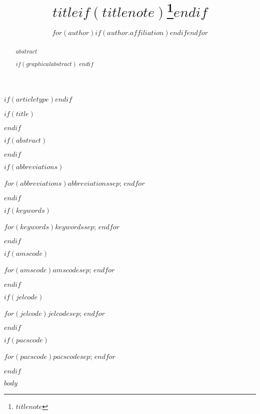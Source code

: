 \documentclass[]{interact}
\begin{document}
$if(articletype)$$endif$

$if(title)$
\title{$title$$if(titlenote)$\thanks{$titlenote$}$endif$}
$endif$

\author{%
$for(author)$$if(author.affiliation)$$endif$$endfor$
}

\maketitle

$if(abstract)$
\begin{abstract}
$abstract$

$if(graphicalabstract)$
$endif$
\end{abstract}
$endif$

$if(abbreviations)$
\begin{abbreviations}
$for(abbreviations)$$abbreviations$$sep$; $endfor$
\end{abbreviations}
$endif$

$if(keywords)$
\begin{keywords}
$for(keywords)$$keywords$$sep$; $endfor$
\end{keywords}
$endif$

$if(amscode)$
\begin{amscode}
$for(amscode)$$amscode$$sep$; $endfor$
\end{amscode}
$endif$

$if(jelcode)$
\begin{jelcode}
$for(jelcode)$$jelcode$$sep$; $endfor$
\end{jelcode}
$endif$

$if(pacscode)$
\begin{pacscode}
$for(pacscode)$$pacscode$$sep$; $endfor$
\end{pacscode}
$endif$


$body$

\end{document}
